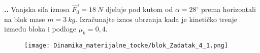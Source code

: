 

\noindent 
\textbf{
\thecjelina.\thezadatak.}
Vanjska sila iznosa $\vec{F_0}=18\ N$ djeluje pod kutom od $\alpha=28 ^\circ$ prema horizontali na blok mase $m=3\ kg$. Izračunajte iznos 
ubrzanja kada je kinetičko trenje između bloka i podloge $\mu_k=0,4$.


\begin{figure}[h]%
  \begin{center}
    \texttt{[image: Dinamika\_materijalne\_tocke/blok\_Zadatak\_4\_1.png]}
  \end{center}
\end{figure}

